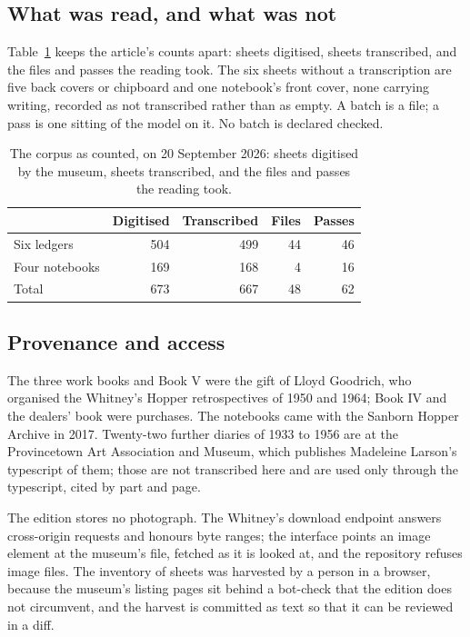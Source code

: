 \documentclass[11pt]{article}
\begin{document}
\subsection{What was read, and what was not}

Table~\ref{tab:coverage} keeps the article's counts apart: sheets digitised,
sheets transcribed, and the files and passes the reading took. The six sheets
without a transcription are five back covers or chipboard and one notebook's
front cover, none carrying writing, recorded as not transcribed rather than
as empty. A batch is a file; a pass is one sitting of the model on it. No
batch is declared checked.

\begin{table}[htbp]\centering\small
\caption{The corpus as counted, on 20 September 2026: sheets digitised by the
museum, sheets transcribed, and the files and passes the reading took.}\label{tab:coverage}
\begin{tabular}{lrrrr}\toprule
 & Digitised & Transcribed & Files & Passes\\\midrule
Six ledgers & 504 & 499 & 44 & 46\\
Four notebooks & 169 & 168 & 4 & 16\\
\midrule Total & 673 & 667 & 48 & 62\\\bottomrule
\end{tabular}
\end{table}

\subsection{Provenance and access}

The three work books and Book V were the gift of Lloyd Goodrich, who organised the Whitney's Hopper retrospectives of 1950 and 1964; Book IV and the dealers' book were purchases. The notebooks came with the Sanborn Hopper Archive in 2017. Twenty-two further diaries of 1933 to 1956 are at the Provincetown Art Association and Museum, which publishes Madeleine Larson's typescript of them; those are not transcribed here and are used only through the typescript, cited by part and page.

The edition stores no photograph. The Whitney's download endpoint answers cross-origin requests and honours byte ranges; the interface points an image element at the museum's file, fetched as it is looked at, and the repository refuses image files. The inventory of sheets was harvested by a person in a browser, because the museum's listing pages sit behind a bot-check that the edition does not circumvent, and the harvest is committed as text so that it can be reviewed in a diff.
\end{document}
